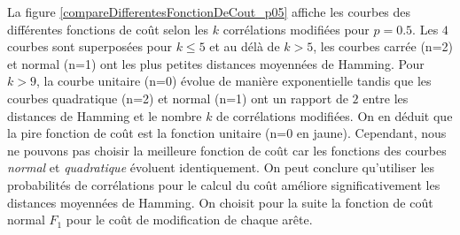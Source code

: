 \documentclass[onecolumn, 12pt]{book}
\begin{document}
La figure \ref{compareDifferentesFonctionDeCout_p05} affiche les courbes des diff\'erentes fonctions de co\^ut selon les $k$ corr\'elations modifi\'ees pour $p = 0.5$.
\newline
Les $4$ courbes sont superpos\'ees pour $k\le5$ et au d\'el\`a de $k>5$, les courbes carr\'ee (n=2) et normal (n=1) ont les plus petites distances moyenn\'ees de Hamming.
Pour $k>9$, la courbe unitaire (n=0) \'evolue de mani\`ere exponentielle tandis que les courbes quadratique (n=2) et normal (n=1) ont un rapport de $2$ entre les distances de Hamming et le nombre $k$ de corr\'elations modifi\'ees.
On en d\'eduit que la pire fonction de co\^ut est la fonction unitaire (n=0 en jaune).
\newline
Cependant, nous ne pouvons pas choisir la meilleure fonction de co\^ut car les fonctions des courbes {\em normal} et {\em quadratique} \'evoluent identiquement.
 On peut conclure qu'utiliser les probabilit\'es de corr\'elations pour le calcul du co\^ut am\'eliore significativement les distances moyenn\'ees de Hamming.
 \newline
 On choisit pour la suite la fonction de co\^ut normal $F_1$ pour le co\^ut de modification de chaque ar\^ete. 
\end{document}
